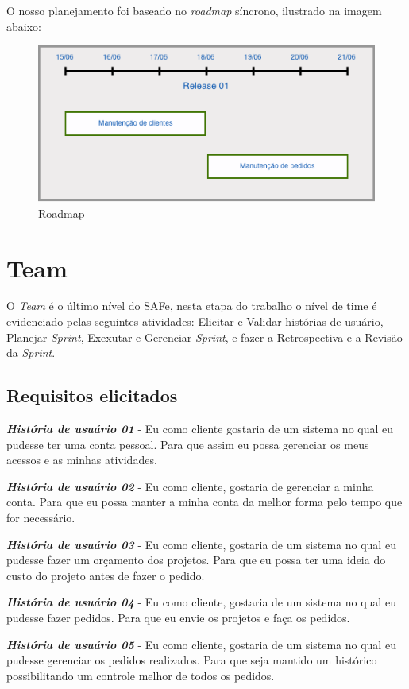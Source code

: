 O nosso planejamento foi baseado no \textit{roadmap} síncrono, ilustrado na imagem abaixo:
  \begin{figure}[!htbp]
    \centering
    \includegraphics[scale=0.75]{figuras/roadmap}
    \caption[Roadmap]{Roadmap\footnotemark}
    \label{Roadmap}
  \end{figure}
  
\section{Team}
O \textit{Team} é o último nível do SAFe, nesta etapa do trabalho o nível de time é evidenciado pelas seguintes atividades: Elicitar e Validar histórias de usuário, Planejar \textit{Sprint}, Exexutar e Gerenciar \textit{Sprint}, e fazer a Retrospectiva e a Revisão da \textit{Sprint}.
\subsection{Requisitos elicitados}
\textbf{\textit{História de usuário 01}} - Eu como cliente gostaria de um sistema no qual eu pudesse ter uma conta pessoal. Para que assim eu possa gerenciar os meus acessos e as minhas atividades.

\textbf{\textit{História de usuário 02}} - Eu como cliente, gostaria de gerenciar a minha conta. Para que eu possa manter a minha conta da melhor forma pelo tempo que for necessário.

\textbf{\textit{História de usuário 03}} - Eu como cliente, gostaria de um sistema no qual eu pudesse fazer um orçamento dos projetos. Para que eu possa ter uma ideia do custo do projeto antes de fazer o pedido.

\textbf{\textit{História de usuário 04}} - Eu como cliente, gostaria de um sistema no qual eu pudesse fazer pedidos. Para que eu envie os projetos e faça os pedidos.

\textbf{\textit{História de usuário 05}} - Eu como cliente, gostaria de um sistema no qual eu pudesse gerenciar os pedidos realizados. Para que seja mantido um histórico possibilitando um controle melhor de todos os pedidos.


